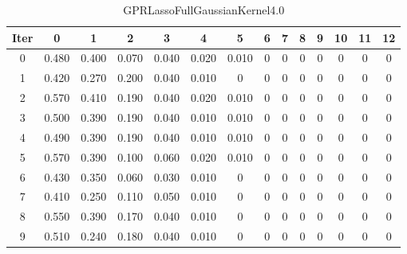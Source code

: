 \begin{table}
	\begin{center}
		\begin{tabular}{|c|c|c|c|c|c|c|c|c|c|c|c|c|c|}
			\hline
			Iter & 0 & 1 & 2 & 3 & 4 & 5 & 6 & 7 & 8 & 9 & 10 & 11 & 12 \\
			\hline
			0 & 0.480 & 0.400 & 0.070 & 0.040 & 0.020 & 0.010 & 0 & 0 & 0 & 0 & 0 & 0 & 0 \\
			\hline
			1 & 0.420 & 0.270 & 0.200 & 0.040 & 0.010 & 0 & 0 & 0 & 0 & 0 & 0 & 0 & 0 \\
			\hline
			2 & 0.570 & 0.410 & 0.190 & 0.040 & 0.020 & 0.010 & 0 & 0 & 0 & 0 & 0 & 0 & 0 \\
			\hline
			3 & 0.500 & 0.390 & 0.190 & 0.040 & 0.010 & 0.010 & 0 & 0 & 0 & 0 & 0 & 0 & 0 \\
			\hline
			4 & 0.490 & 0.390 & 0.190 & 0.040 & 0.010 & 0.010 & 0 & 0 & 0 & 0 & 0 & 0 & 0 \\
			\hline
			5 & 0.570 & 0.390 & 0.100 & 0.060 & 0.020 & 0.010 & 0 & 0 & 0 & 0 & 0 & 0 & 0 \\
			\hline
			6 & 0.430 & 0.350 & 0.060 & 0.030 & 0.010 & 0 & 0 & 0 & 0 & 0 & 0 & 0 & 0 \\
			\hline
			7 & 0.410 & 0.250 & 0.110 & 0.050 & 0.010 & 0 & 0 & 0 & 0 & 0 & 0 & 0 & 0 \\
			\hline
			8 & 0.550 & 0.390 & 0.170 & 0.040 & 0.010 & 0 & 0 & 0 & 0 & 0 & 0 & 0 & 0 \\
			\hline
			9 & 0.510 & 0.240 & 0.180 & 0.040 & 0.010 & 0 & 0 & 0 & 0 & 0 & 0 & 0 & 0 \\
			\hline
		\end{tabular}
	\end{center}
	\caption{GPRLassoFullGaussianKernel4.0}
\end{table}